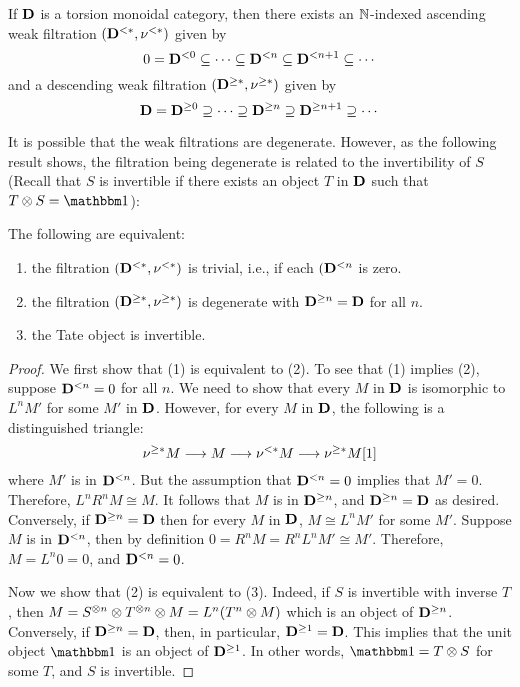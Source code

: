 \begin{thm}\label{thm_summary_triang_cat}
  If $\mathbf{D}$ is a torsion monoidal category, then there exists an
  $\mathbb{N}$-indexed ascending weak filtration $(\mathbf{D}^{< *},
  \nu^{< *})$ given by
\[
0 = \mathbf{D}^{< 0} \subseteq \cdots \subseteq \mathbf{D}^{< n}
   \subseteq \mathbf{D}^{< n + 1} \subseteq \cdots
\]
and a descending weak filtration $(\mathbf{D}^{\geq *}, \nu^{\geq *})$
given by
\[
\mathbf{D} = \mathbf{D}^{\geq 0} \supseteq \cdots \supseteq \mathbf{D}^{\geq n}
\supseteq \mathbf{D}^{\geq n + 1} \supseteq \cdots
\]
\end{thm}

It is possible that the weak filtrations are degenerate. However, as 
the following result shows, the filtration being degenerate is 
related to the invertibility of $S$ (Recall that $S$ is 
invertible if there exists an object $T$ in $\mathbf{D}$ such that $T 
\tensor S = \Unit$):

\begin{prop}\label{prop_filt_trivial_cond}
The following are equivalent:
\begin{enumerate}
\item the filtration $(\mathbf{D}^{< *}, \nu^{< *})$ is trivial,
  i.e., if each $(\mathbf{D}^{< n}$ is zero.

\item the filtration $(\mathbf{D}^{\geq *}, \nu^{\geq *})$ is 
degenerate with $\mathbf{D}^{\geq n} = \mathbf{D}$ for all $n$.

\item the Tate object is invertible.
\end{enumerate}
\end{prop}
\begin{proof}
We first show that (1) is equivalent to (2). To see that (1) implies
(2), suppose $\mathbf{D}^{< n} = 0$ for all $n$. We need to show
that every $M$ in $\mathbf{D}$ is isomorphic to $L^n M'$ for some $M'$
in $\mathbf{D}$. However, for every $M$ in $\mathbf{D}$, the following is
a distinguished triangle:
\[
\nu^{\geq *}M \longrightarrow M \longrightarrow \nu^{< *}M \longrightarrow \nu^{\geq *} M[1]
\]
where $M'$ is in $\mathbf{D}^{< n}$. But the assumption that
$\mathbf{D}^{< n} = 0$ implies that $M' = 0$. Therefore, $L^n R^n M
\cong M$. It follows that $M$ is in $\mathbf{D}^{\geq n}$, and
$\mathbf{D}^{\geq n} = \mathbf{D}$ as desired. Conversely, if
$\mathbf{D}^{\geq n} = \mathbf{D}$ then for every $M$ in $\mathbf{D}$, $M \cong
L^n M'$ for some $M'$. Suppose $M$ is in $\mathbf{D}^{< n}$, then by
definition $0 = R^n M = R^nL^n M' \cong M'$.  Therefore, $M = L^n 0 =
0$, and $\mathbf{D}^{< n} = 0$.

Now we show that (2) is equivalent to (3). Indeed, if $S$ is 
invertible with inverse $T$, then $M = S^{\otimes n} \otimes 
T^{\otimes n} \otimes M = L^n(T^n \otimes M)$ which is an object 
of $\mathbf{D}^{\geq n}$. Conversely, if $\mathbf{D}^{\geq n} = 
\mathbf{D}$, then, in particular, $\mathbf{D}^{\geq 1} = \mathbf{D}$. This
implies that the unit object $\Unit$ is an object of $\mathbf{D}^{\geq 1}$.
In other words, $\Unit = T \tensor S$ for some $T$, and $S$ is
invertible.
\end{proof}

